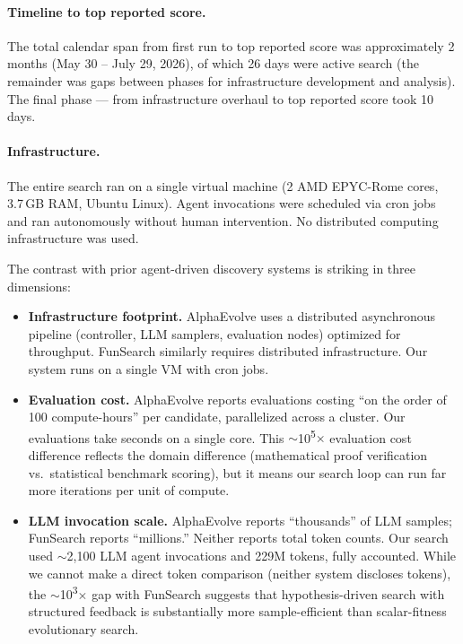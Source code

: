 \documentclass[11pt,a4paper]{article}
\begin{document}
\paragraph{Timeline to top reported score.}
The total calendar span from first run to top reported score was approximately 2 months (May 30 -- July 29, 2026), of which 26 days were active search (the remainder was gaps between phases for infrastructure development and analysis). The final phase --- from infrastructure overhaul to top reported score took 10 days.

\paragraph{Infrastructure.}
The entire search ran on a single virtual machine (2 AMD EPYC-Rome cores, 3.7\,GB RAM, Ubuntu Linux). Agent invocations were scheduled via cron jobs and ran autonomously without human intervention. No distributed computing infrastructure was used.

The contrast with prior agent-driven discovery systems is striking in three dimensions:

\begin{itemize}
    \item \textbf{Infrastructure footprint.} AlphaEvolve uses a distributed asynchronous pipeline (controller, LLM samplers, evaluation nodes) optimized for throughput. FunSearch similarly requires distributed infrastructure. Our system runs on a single VM with cron jobs.
    
    \item \textbf{Evaluation cost.} AlphaEvolve reports evaluations costing ``on the order of 100 compute-hours'' per candidate, parallelized across a cluster. Our evaluations take seconds on a single core. This $\sim$10\textsuperscript{5}$\times$ evaluation cost difference reflects the domain difference (mathematical proof verification vs.\ statistical benchmark scoring), but it means our search loop can run far more iterations per unit of compute.
    
    \item \textbf{LLM invocation scale.} AlphaEvolve reports ``thousands'' of LLM samples; FunSearch reports ``millions.'' Neither reports total token counts. Our search used $\sim$2,100 LLM agent invocations and 229M tokens, fully accounted. While we cannot make a direct token comparison (neither system discloses tokens), the $\sim$10\textsuperscript{3}$\times$ gap with FunSearch suggests that hypothesis-driven search with structured feedback is substantially more sample-efficient than scalar-fitness evolutionary search.
\end{itemize}
\end{document}
